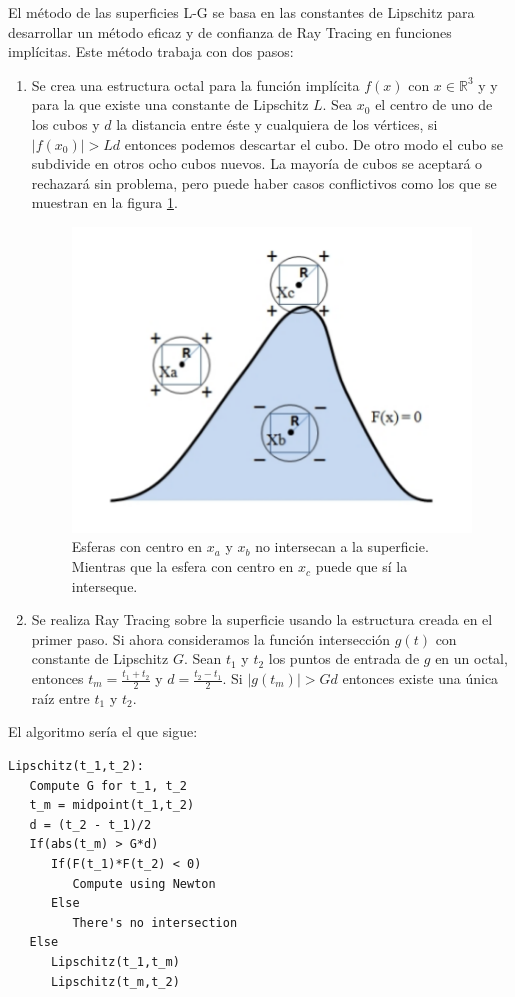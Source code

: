 El método de las superficies L-G \cite{Kalra89} se basa en las constantes de Lipschitz para desarrollar un método eficaz y de confianza de Ray Tracing en funciones implícitas. Este método trabaja con dos pasos:
\begin{enumerate}
\item Se crea una estructura octal para la función implícita $f(x)$ con $x \in \mathbb{R}^3$ y y para la que existe una constante de Lipschitz $L$. Sea $x_0$ el centro de uno de los cubos y $d$ la distancia entre éste y cualquiera de los vértices, si $|f(x_0)| > Ld$ entonces podemos descartar el cubo. De otro modo el cubo se subdivide en otros ocho cubos nuevos. La mayoría de cubos se aceptará o rechazará sin problema, pero puede haber casos conflictivos como los que se muestran en la figura \ref{florez411}.
\begin{figure}[h]
	\centering
	\includegraphics[scale=0.5]{images/florez9.png}
	\caption{Esferas con centro en $x_a$ y $x_b$ no intersecan a la superficie. Mientras que la esfera con centro en $x_c$ puede que sí la interseque.}
	\label{florez411}
\end{figure}

\item Se realiza Ray Tracing sobre la superficie usando la estructura creada en el primer paso. Si ahora consideramos la función intersección $g(t)$ con constante de Lipschitz $G$. Sean $t_1$ y $t_2$ los puntos de entrada de $g$ en un octal, entonces $t_m = \frac{t_1 + t_2}{2}$ y $d = \frac{t_2 - t_1}{2}$. Si $|g(t_m)| > Gd$ entonces existe una única raíz entre $t_1$ y $t_2$. 
\end{enumerate}

El algoritmo sería el que sigue:
\begin{verbatim}
Lipschitz(t_1,t_2):
   Compute G for t_1, t_2
   t_m = midpoint(t_1,t_2)
   d = (t_2 - t_1)/2
   If(abs(t_m) > G*d)
      If(F(t_1)*F(t_2) < 0)
         Compute using Newton
      Else
         There's no intersection
   Else
      Lipschitz(t_1,t_m)
      Lipschitz(t_m,t_2)
\end{verbatim}

